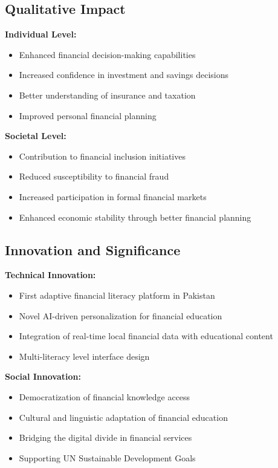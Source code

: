 \documentclass[conference]{IEEEtran}
\begin{document}
\subsection{Qualitative Impact}

\textbf{Individual Level:}
\begin{itemize}
    \item Enhanced financial decision-making capabilities
    \item Increased confidence in investment and savings decisions
    \item Better understanding of insurance and taxation
    \item Improved personal financial planning
\end{itemize}

\textbf{Societal Level:}
\begin{itemize}
    \item Contribution to financial inclusion initiatives
    \item Reduced susceptibility to financial fraud
    \item Increased participation in formal financial markets
    \item Enhanced economic stability through better financial planning
\end{itemize}

\subsection{Innovation and Significance}

\textbf{Technical Innovation:}
\begin{itemize}
    \item First adaptive financial literacy platform in Pakistan
    \item Novel AI-driven personalization for financial education
    \item Integration of real-time local financial data with educational content
    \item Multi-literacy level interface design
\end{itemize}

\textbf{Social Innovation:}
\begin{itemize}
    \item Democratization of financial knowledge access
    \item Cultural and linguistic adaptation of financial education
    \item Bridging the digital divide in financial services
    \item Supporting UN Sustainable Development Goals
\end{itemize}
\end{document}
